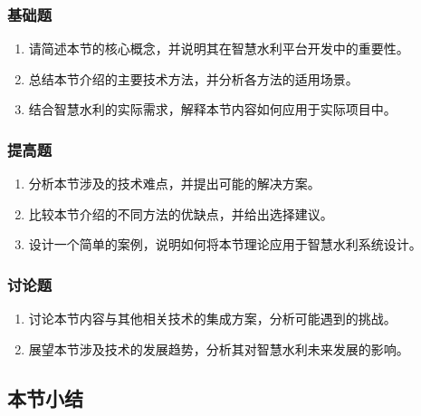 \hypertarget{ux57faux7840ux9898-3}{%
\subsubsection{基础题}\label{ux57faux7840ux9898-3}}

\begin{enumerate}
\def\labelenumi{\arabic{enumi}.}
\tightlist
\item
  请简述本节的核心概念，并说明其在智慧水利平台开发中的重要性。
\item
  总结本节介绍的主要技术方法，并分析各方法的适用场景。
\item
  结合智慧水利的实际需求，解释本节内容如何应用于实际项目中。
\end{enumerate}

\hypertarget{ux63d0ux9ad8ux9898-3}{%
\subsubsection{提高题}\label{ux63d0ux9ad8ux9898-3}}

\begin{enumerate}
\def\labelenumi{\arabic{enumi}.}
\tightlist
\item
  分析本节涉及的技术难点，并提出可能的解决方案。
\item
  比较本节介绍的不同方法的优缺点，并给出选择建议。
\item
  设计一个简单的案例，说明如何将本节理论应用于智慧水利系统设计。
\end{enumerate}

\hypertarget{ux8ba8ux8bbaux9898-3}{%
\subsubsection{讨论题}\label{ux8ba8ux8bbaux9898-3}}

\begin{enumerate}
\def\labelenumi{\arabic{enumi}.}
\tightlist
\item
  讨论本节内容与其他相关技术的集成方案，分析可能遇到的挑战。
\item
  展望本节涉及技术的发展趋势，分析其对智慧水利未来发展的影响。
\end{enumerate}

\hypertarget{ux672cux8282ux5c0fux7ed3-2}{%
\subsection{本节小结}\label{ux672cux8282ux5c0fux7ed3-2}}

